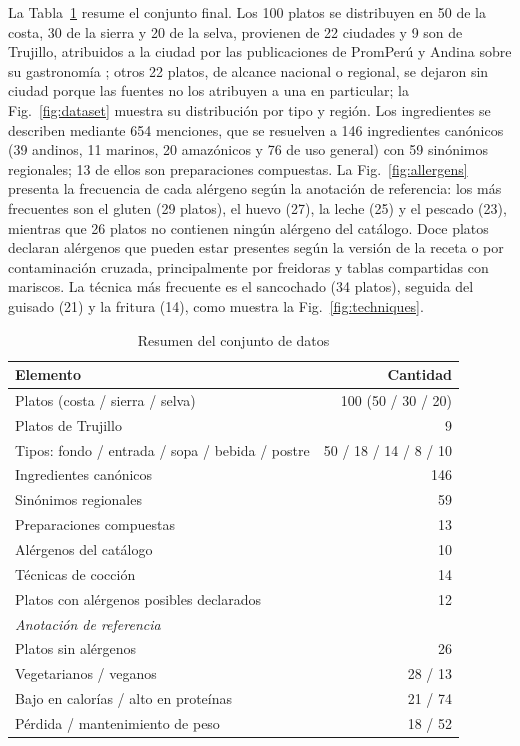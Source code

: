 \documentclass[conference]{IEEEtran}
\begin{document}
La Tabla~\ref{tab:dataset} resume el conjunto final. Los 100 platos se distribuyen en 50 de la costa, 30 de la sierra y 20 de la selva, provienen de 22 ciudades y 9 son de Trujillo, atribuidos a la ciudad por las publicaciones de PromPerú y Andina sobre su gastronomía \cite{marcaperu2018trujillo,andina2024trujillo}; otros 22 platos, de alcance nacional o regional, se dejaron sin ciudad porque las fuentes no los atribuyen a una en particular; la Fig.~\ref{fig:dataset} muestra su distribución por tipo y región. Los ingredientes se describen mediante 654 menciones, que se resuelven a 146 ingredientes canónicos (39 andinos, 11 marinos, 20 amazónicos y 76 de uso general) con 59 sinónimos regionales; 13 de ellos son preparaciones compuestas. La Fig.~\ref{fig:allergens} presenta la frecuencia de cada alérgeno según la anotación de referencia: los más frecuentes son el gluten (29 platos), el huevo (27), la leche (25) y el pescado (23), mientras que 26 platos no contienen ningún alérgeno del catálogo. Doce platos declaran alérgenos que pueden estar presentes según la versión de la receta o por contaminación cruzada, principalmente por freidoras y tablas compartidas con mariscos. La técnica más frecuente es el sancochado (34 platos), seguida del guisado (21) y la fritura (14), como muestra la Fig.~\ref{fig:techniques}.

\begin{table}[t]
\centering
\caption{Resumen del conjunto de datos}
\label{tab:dataset}
\begin{tabular}{lr}
\toprule
Elemento & Cantidad \\
\midrule
Platos (costa / sierra / selva) & 100 (50 / 30 / 20) \\
Platos de Trujillo & 9 \\
Tipos: fondo / entrada / sopa / bebida / postre & 50 / 18 / 14 / 8 / 10 \\
Ingredientes canónicos & 146 \\
Sinónimos regionales & 59 \\
Preparaciones compuestas & 13 \\
Alérgenos del catálogo & 10 \\
Técnicas de cocción & 14 \\
Platos con alérgenos posibles declarados & 12 \\
\midrule
\multicolumn{2}{l}{\emph{Anotación de referencia}} \\
Platos sin alérgenos & 26 \\
Vegetarianos / veganos & 28 / 13 \\
Bajo en calorías / alto en proteínas & 21 / 74 \\
Pérdida / mantenimiento de peso & 18 / 52 \\
\bottomrule
\end{tabular}
\end{table}
\end{document}

